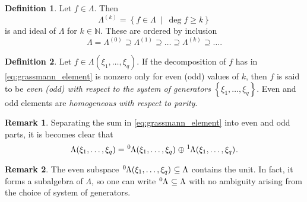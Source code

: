 \documentclass{article}
\theoremstyle{definition}
\newtheorem{definition}{Definition}
\newtheorem*{remark}{Remark}
\begin{document}
\begin{definition}
    Let $f \in \Lambda$. Then 
    \begin{equation*}
        \Lambda^{(k)} = \left\{ f \in \Lambda \ \middle| \ \deg f \geq k \right\}
    \end{equation*}
    is and ideal of $\Lambda$ for $k \in \mathbb{N}$. These are ordered by inclusion
    \begin{equation*}
        \Lambda = \Lambda^{(0)} \supseteq \Lambda^{(1)} \supseteq \dots
        \supseteq \Lambda^{(k)} \supseteq \dots.
    \end{equation*}
\end{definition}

\begin{definition}
    Let $f \in \Lambda(\xi_1, \dots, \xi_q)$. If the decomposition of $f$ has in \eqref{eq:grassmann_element} is nonzero only for even (odd) values of $k$, then $f$ is said to be \emph{even (odd) with respect to the system of generators} $\left\{ \xi_1, \dots, \xi_q \right\}$. Even and odd elements are \emph{homogeneous with respect to parity}.
\end{definition}

\begin{remark}
    Separating the sum in \eqref{eq:grassmann_element} into even and odd parts, it is becomes clear that
    \begin{equation*}
        \Lambda(\xi_1, \dots, \xi_q) = \tensor[^0]{\Lambda(\xi_1, \dots, \xi_q)}{} \oplus \tensor[^1]{\Lambda(\xi_1, \dots, \xi_q)}{}.
    \end{equation*}
\end{remark}

\begin{remark}
    The even subspace $\tensor[^0]{\Lambda(\xi_1, \dots, \xi_q)}{} \subseteq \Lambda$ contains the unit. In fact, it forms a subalgebra of $\Lambda$, so one can write $\tensor[^0]{\Lambda}{} \subseteq \Lambda$ with no ambiguity arising from the choice of system of generators.
\end{remark}
\end{document}
